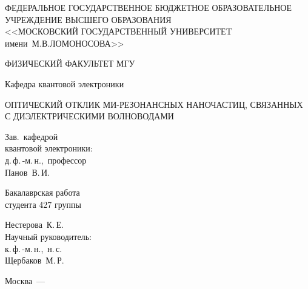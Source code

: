 \begin{titlepage} 

	{
		\centering
		\normalsize
					
		ФЕДЕРАЛЬНОЕ ГОСУДАРСТВЕННОЕ БЮДЖЕТНОЕ ОБРАЗОВАТЕЛЬНОЕ\\ 
		УЧРЕЖДЕНИЕ ВЫСШЕГО ОБРАЗОВАНИЯ\\ 
		<<МОСКОВСКИЙ ГОСУДАРСТВЕННЫЙ УНИВЕРСИТЕT\\ 
		имени~М.В.ЛОМОНОСОВА>>
			
		\vspace{0.4 cm} 
			
		\uppercase{Физический факультет МГУ}
			
		\vspace{0.2 cm} 
			
		Кафедра квантовой электроники
		
		\par
	} 
	
	\vspace{4 cm} 
	
	{
		\centering
		\Large
		\uppercase{
			Оптический отклик Ми-резонансных наночастиц, связанных с диэлектрическими волноводами	
		}
		 
		\par
	} 
	
	\vspace{4 cm} 
	
	{
		\begin{minipage}{0.5\textwidth}
		
			\begin{flushleft}
				Зав.~кафедрой\\ 
				квантовой электроники:\\ 
				д.\,ф.\,-м.\,н.,~профессор\\ 
				Панов~В.\,И.
			\end{flushleft}	
			
		\end{minipage}
		\begin{minipage}{0.5\textwidth}
		
			\begin{flushright}
				Бакалаврская работа\\ 
				студента 427 группы\\ 
			
				\vspace{0.3 cm}
			
				Нестерова~К.\,Е.\\ 
				Научный руководитель: \\ 
				к.\,ф.\,-м.\,н.,~н.\,с.\\ 

				Щербаков~М.\,Р.
			\end{flushright}
			
		\end{minipage}
	} 
	
	\vfill 
	
	\centerline{Москва~— \the\year} 
	
\end{titlepage} 

\setcounter{page}{2}
\newpage